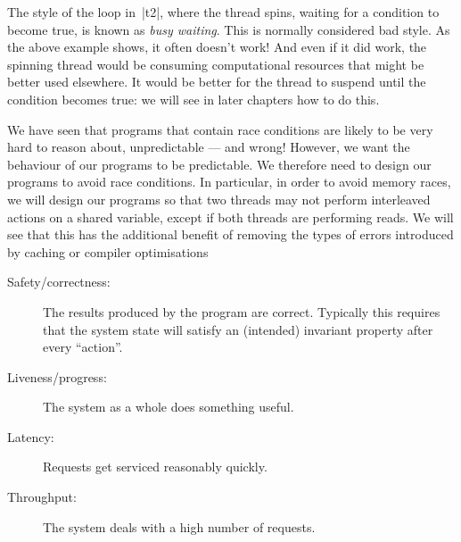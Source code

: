 The style of the loop in~|t2|, where the thread spins, waiting for a condition
to become true, is known as \emph{busy waiting}.  This is normally considered
bad style.  As the above example shows, it often doesn't work!  And even if it
did work, the spinning thread would be consuming computational resources that
might be better used elsewhere.  It would be better for the thread to suspend
until the condition becomes true: we will see in later chapters how to do
this.  

We have seen that programs that contain race conditions are likely to be very
hard to reason about, unpredictable --- and wrong!  However, we want the
behaviour of our programs to be predictable.  We therefore need to design our
programs to avoid race conditions.  In particular, in order to avoid memory
races, we will design our programs so that two threads may not perform
interleaved actions on a shared variable, except if both threads are
performing reads.  We will see that this has the additional benefit of
removing the types of errors introduced by caching or compiler optimisations




\begin{description}
\item[Safety/correctness:] The results produced by the program are correct.
  Typically this requires that the system state will satisfy an (intended)
  invariant property after every ``action''.

\item[Liveness/progress:] The system as a whole does something useful.
\end{description}

\bigskip


\begin{description}
\item[Latency:]
Requests get serviced reasonably quickly.

\item[Throughput:]
The system deals with a high number of requests.
\end{description}



